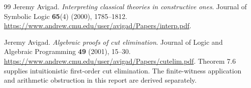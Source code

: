 \documentclass[11pt,letterpaper]{article}
\theoremstyle{definition}\newtheorem{definition}[theorem]{Definition}
\theoremstyle{remark}\newtheorem{remark}[theorem]{Remark}
\begin{document}
\begin{thebibliography}{99}
Jeremy Avigad. \emph{Interpreting classical theories in constructive ones}.
Journal of Symbolic Logic \textbf{65}(4) (2000), 1785--1812.
\url{https://www.andrew.cmu.edu/user/avigad/Papers/interp.pdf}.

Jeremy Avigad. \emph{Algebraic proofs of cut elimination}.
Journal of Logic and Algebraic Programming \textbf{49} (2001), 15--30.
\url{https://www.andrew.cmu.edu/user/avigad/Papers/cutelim.pdf}.
Theorem 7.6 supplies intuitionistic first-order cut elimination.
The finite-witness application and arithmetic obstruction in this report
are derived separately.
\end{thebibliography}
\end{document}
